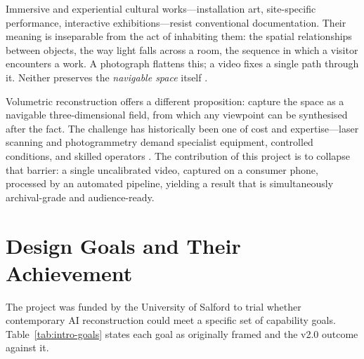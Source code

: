 Immersive and experiential cultural works---installation art, site-specific performance, interactive exhibitions---resist conventional documentation. Their meaning is inseparable from the act of inhabiting them: the spatial relationships between objects, the way light falls across a room, the sequence in which a visitor encounters a work. A photograph flattens this; a video fixes a single path through it. Neither preserves the \emph{navigable space} itself \parencite{UNESCO2003,Champion2011}.

Volumetric reconstruction offers a different proposition: capture the space as a navigable three-dimensional field, from which any viewpoint can be synthesised after the fact. The challenge has historically been one of cost and expertise---laser scanning and photogrammetry demand specialist equipment, controlled conditions, and skilled operators \parencite{Remondino2011,Stylianidis2016}. The contribution of this project is to collapse that barrier: a single uncalibrated video, captured on a consumer phone, processed by an automated pipeline, yielding a result that is simultaneously archival-grade and audience-ready.

\section{Design Goals and Their Achievement}
\label{sec:intro-goals}

The project was funded by the University of Salford to trial whether contemporary AI reconstruction could meet a specific set of capability goals. Table~\ref{tab:intro-goals} states each goal as originally framed and the v2.0 outcome against it.

